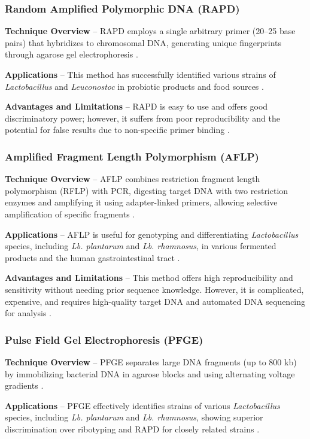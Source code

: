 \subsubsection{Random Amplified Polymorphic DNA (RAPD)}
\textbf{Technique Overview} – RAPD employs a single arbitrary primer (20–25 base pairs) that hybridizes to chromosomal DNA, generating unique fingerprints through agarose gel electrophoresis \cite*{L4-MolTyping}.

\textbf{Applications} – This method has successfully identified various strains of \textit{Lactobacillus} and \textit{Leuconostoc} in probiotic products and food sources \cite*{L4-MolTyping}.

\textbf{Advantages and Limitations} – RAPD is easy to use and offers good discriminatory power; however, it suffers from poor reproducibility and the potential for false results due to non-specific primer binding \cite*{L4-MolTyping}.

\subsubsection{Amplified Fragment Length Polymorphism (AFLP)}
\textbf{Technique Overview} – AFLP combines restriction fragment length polymorphism (RFLP) with PCR, digesting target DNA with two restriction enzymes and amplifying it using adapter-linked primers, allowing selective amplification of specific fragments \cite*{L4-MolTyping}.

\textbf{Applications} – AFLP is useful for genotyping and differentiating \textit{Lactobacillus} species, including \textit{Lb. plantarum} and \textit{Lb. rhamnosus}, in various fermented products and the human gastrointestinal tract \cite*{L4-MolTyping}.

\textbf{Advantages and Limitations} – This method offers high reproducibility and sensitivity without needing prior sequence knowledge. However, it is complicated, expensive, and requires high-quality target DNA and automated DNA sequencing for analysis \cite*{L4-MolTyping}.

\subsubsection{Pulse Field Gel Electrophoresis (PFGE)}
\textbf{Technique Overview} – PFGE separates large DNA fragments (up to 800 kb) by immobilizing bacterial DNA in agarose blocks and using alternating voltage gradients \cite*{L4-MolTyping}.

\textbf{Applications} – PFGE effectively identifies strains of various \textit{Lactobacillus} species, including \textit{Lb. plantarum} and \textit{Lb. rhamnosus}, showing superior discrimination over ribotyping and RAPD for closely related strains \cite*{L4-MolTyping}.

